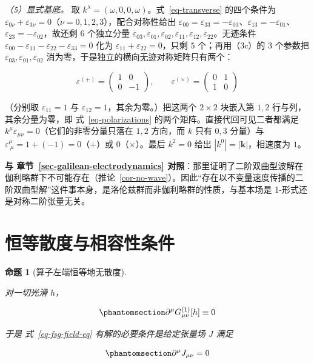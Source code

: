 \documentclass[
  chinese,
  a4paper,
  UTF8,
  12pt,
  oneside,
  openany]{ctexbook}
\theoremstyle{plain}
\theoremstyle{plain}
\theoremstyle{plain}
\newtheorem{proposition}{命题}[chapter]
\theoremstyle{definition}
\theoremstyle{plain}
\theoremstyle{plain}
\theoremstyle{remark}
\begin{document}
\emph{（5）显式基底。} 取
\(k^{\lambda}=(\omega,0,0,\omega)\)。式~\ref{eq-transverse} 的四个条件为
\(\varepsilon_{0\nu}+\varepsilon_{3\nu}=0\)（\(\nu=0,1,2,3\)），配合对称性给出
\(\varepsilon_{00}=\varepsilon_{33}=-\varepsilon_{03}\)、\(\varepsilon_{13}=-\varepsilon_{01}\)、\(\varepsilon_{23}=-\varepsilon_{02}\)，故还剩
\(6\) 个独立分量
\(\varepsilon_{03},\varepsilon_{01},\varepsilon_{02},\varepsilon_{11},\varepsilon_{12},\varepsilon_{22}\)。无迹条件
\(\varepsilon_{00}-\varepsilon_{11}-\varepsilon_{22}-\varepsilon_{33}=0\)
化为 \(\varepsilon_{11}+\varepsilon_{22}=0\)，只剩 \(5\)
个；再用（3c）的 \(3\) 个参数把
\(\varepsilon_{03},\varepsilon_{01},\varepsilon_{02}\)
消为零，于是独立的横向无迹对称矩阵只有两个：

\[
\varepsilon^{(+)}=
\begin{pmatrix}1&0\\0&-1\end{pmatrix},
\qquad
\varepsilon^{(\times)}=
\begin{pmatrix}0&1\\1&0\end{pmatrix}
\]

（分别取 \(\varepsilon_{11}=1\) 与
\(\varepsilon_{12}=1\)，其余为零。）把这两个 \(2\times2\) 块嵌入第
\(1,2\) 行与列，其余分量为零，即 式~\ref{eq-polarizations}
的两个矩阵。直接代回可见二者都满足
\(k^{\mu}\varepsilon_{\mu\nu}=0\)（它们的非零分量只落在 \(1,2\) 方向，而
\(k\) 只有 \(0,3\) 分量）与
\(\varepsilon^{\mu}_{\ \mu}=1+(-1)=0\)（\(+\)）或
\(0\)（\(\times\)）。最后 \(k^{2}=0\) 给出
\(|k^{0}|=|\mathbf{k}|\)，相速度为 \(1\)。

\textbf{与 章节~\ref{sec-galilean-electrodynamics}
对照}：那里证明了二阶双曲型波解在伽利略群下不可能存在（推论~\ref{cor-no-wave}）。因此``存在以不变量速度传播的二阶双曲型解''这件事本身，是洛伦兹群而非伽利略群的性质，与基本场是
1-形式还是对称二阶张量无关。

\section{恒等散度与相容性条件}\label{sec-fsg-bianchi}

\begin{proposition}[算子左端恒等地无散度]\protect\hypertarget{prp-bianchi}{}\label{prp-bianchi}

对一切光滑 \(h\)，

\begin{equation}\protect\phantomsection\label{eq-lin-bianchi}{
\partial^{\mu}G^{(1)}_{\mu\nu}[h] \equiv 0
}\end{equation}

于是 式~\ref{eq-fsg-field-eq} 有解的必要条件是给定张量场 \(J\) 满足

\begin{equation}\protect\phantomsection\label{eq-source-conservation}{
\partial^{\mu}J_{\mu\nu} = 0
}\end{equation}

\end{proposition}
\end{document}
